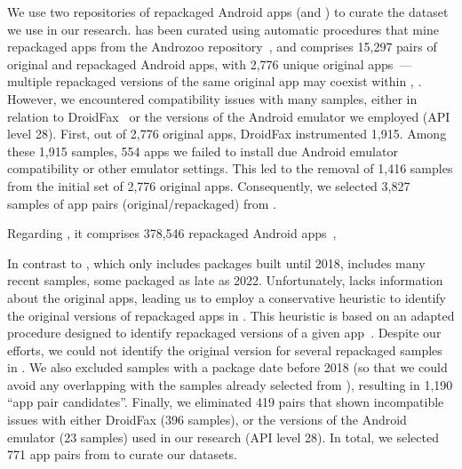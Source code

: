 We use two repositories of repackaged Android apps (\repack and \amc) to
curate the dataset we use in our research. \repack has been curated using automatic procedures that mine repackaged apps from the Androzoo
repository~\cite{DBLP:conf/msr/AllixBKT16}, and
comprises 15,297 pairs of original and repackaged Android apps, with 2,776 unique original apps~\cite{DBLP:journals/tse/LiBK21}---
multiple repackaged versions of the same original app may coexist within \repack, .
However, we encountered compatibility issues with many samples, either in relation to DroidFax~\cite{DBLP:conf/icsm/CaiR17a} or the versions of the Android emulator we employed (API level 28). First, out of 2,776 original apps, DroidFax instrumented 1,915. Among these 1,915 samples, 554 apps we failed to install due Android emulator compatibility or other emulator settings. This led to the removal of 1,416 samples from the initial set of 2,776 original apps. Consequently, we selected 3,827 samples of app pairs (original/repackaged) from \repack. 



Regarding \amc, it comprises 378,546 repackaged Android apps~\cite{andromalpack}, 

In contrast to \repack,
which only includes packages built until 2018, \amc includes many recent samples, some packaged as late as 2022.
Unfortunately, \amc lacks information about the original apps, leading us to employ a conservative heuristic
to identify the original versions of repackaged apps in \amc. This heuristic is based on an adapted
procedure designed to identify repackaged versions of a given app~\cite{DBLP:journals/tse/LiBK21}.
Despite our efforts, we could not identify the original version for several repackaged samples in \amc.
We also excluded samples with a package date before 2018 (so that we could avoid any overlapping with
the samples already selected from \repack), resulting in 1,190 ``app pair candidates''.
Finally, we eliminated 419 pairs that shown incompatible issues with either DroidFax (396 samples), or the versions of the Android
emulator (23 samples) used in our research (API level 28). In total, we selected 771 app pairs from \amc to curate our datasets.

